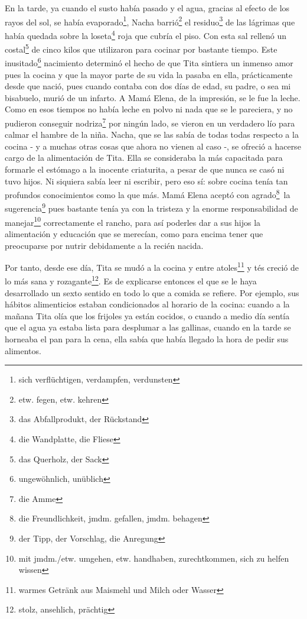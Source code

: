 En la tarde, ya cuando el susto había pasado y el agua, gracias al
efecto de los rayos del sol, se había evaporado\footnote{sich verflüchtigen, verdampfen, verdunsten},
Nacha barrió\footnote{etw. fegen, etw. kehren} el residuo\footnote{das Abfallprodukt, der Rückstand} de las lágrimas
que había quedada sobre la loseta\footnote{die Wandplatte, die Fliese}
roja que cubría el piso. Con esta sal rellenó un costal\footnote{das Querholz, der Sack} de cinco kilos que
utilizaron para cocinar por bastante tiempo. Este inusitado\footnote{ungewöhnlich, unüblich}
nacimiento determinó el hecho de que Tita sintiera un inmenso amor pues
la cocina y que la mayor parte de su vida la pasaba en ella, prácticamente
desde que nació, pues cuando contaba con dos días de edad, su padre, o sea
mi bisabuelo, murió de un infarto. A Mamá Elena, de la impresión, se le
fue la leche. Como en esos tiempos no había leche en polvo ni nada que se
le pareciera, y no pudieron conseguir nodriza\footnote{die Amme}
por ningún lado, se vieron en un verdadero lío para calmar el hambre de la
niña. Nacha, que se las sabía de todas todas respecto a la cocina - y a muchas
otras cosas que ahora no vienen al caso -, se ofreció a hacerse cargo de
la alimentación de Tita. Ella se consideraba la más capacitada para
\glqq{}formarle el estómago a la inocente criaturita\grqq{}, a pesar de que nunca se
casó ni tuvo hijos. Ni siquiera sabía leer ni escribir, pero eso sí: sobre
cocina tenía tan profundos conocimientos como la que más. Mamá Elena aceptó
con agrado\footnote{die Freundlichkeit, jmdm. gefallen, jmdm. behagen}~la sugerencia\footnote{der Tipp, der Vorschlag, die Anregung}
pues bastante tenía ya con la tristeza y la enorme responsabilidad de manejar\footnote{mit jmdm./etw. umgehen, etw. handhaben, zurechtkommen, sich zu helfen wissen}
correctamente el rancho, para así poderles
dar a sus hijos la alimentación y educación que se merecían, como para
encima tener que preocuparse por nutrir debidamente a la recién nacida.

Por tanto, desde ese día, Tita se mudó a la cocina y entre atoles\footnote{warmes Getränk aus Maismehl und Milch oder Wasser}
y tés creció de lo más sana y rozagante\footnote{stolz, ansehlich, prächtig}.
Es de explicarse entonces el que se le haya desarrollado un sexto sentido
en todo lo que a comida se refiere. Por ejemplo, sus hábitos alimenticios
estaban condicionados al horario de la cocina: cuando a la mañana Tita
olía que los frijoles ya están cocidos, o cuando a medio día sentía que
el agua ya estaba lista para desplumar a las gallinas, cuando en la tarde
se horneaba el pan para la cena, ella sabía que había llegado la hora de
pedir sus alimentos.

